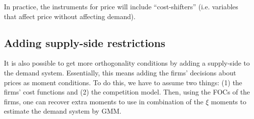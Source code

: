 In practice, the instruments for price will include ``cost-shifters'' (i.e. variables that affect price without affecting demand).

\subsection{Adding supply-side restrictions}

It is also possible to get more orthogonality conditions by adding a supply-side to the demand system. Essentially, this means adding the firms' decisions about prices as moment conditions. To do this, we have to assume two things: (1) the firms' cost functions and (2) the competition model. Then, using the FOCs of the firms, one can recover extra moments to use in combination of the $\xi$ moments to estimate the demand system by GMM.


